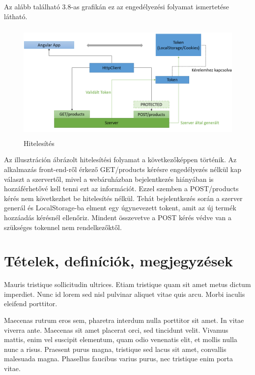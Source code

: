  Az alább található 3.8-as grafikán ez az engedélyezési folyamat ismertetése látható.
 
\begin{figure}[H]
	\centering
	\includegraphics[width=1.0\textwidth,height=220px]{images/hitelesites_bemutatasa.png}
	\caption{Hitelesítés}
	\label{fig.picture-9}
\end{figure}

Az illusztráción ábrázolt hitelesítési folyamat a következőképpen történik. Az alkalmazás front-end-ről érkező GET/products kérésre engedélyezés nélkül kap választ a szervertől, mivel a webáruházban bejelentkezés hiányában is hozzáférhetővé kell tenni ezt az információt. Ezzel szemben a POST/products kérés nem következhet be hitelesítés nélkül. Tehát bejelentkezés során a szerver generál és LocalStorage-ba elment egy úgynevezett tokent, amit az új termék hozzáadás kérésnél ellenőriz. Mindent összevetve a POST kérés védve van a szükséges tokennel nem rendelkezőktől.

\section{Tételek, definíciók, megjegyzések} %

\begin{definition}
Mauris tristique sollicitudin ultrices. Etiam tristique quam sit amet metus dictum imperdiet. Nunc id lorem sed nisl pulvinar aliquet vitae quis arcu. Morbi iaculis eleifend porttitor.
\end{definition}

Maecenas rutrum eros sem, pharetra interdum nulla porttitor sit amet. In vitae viverra ante. Maecenas sit amet placerat orci, sed tincidunt velit. Vivamus mattis, enim vel suscipit elementum, quam odio venenatis elit, et mollis nulla nunc a risus. Praesent purus magna, tristique sed lacus sit amet, convallis malesuada magna. Phasellus faucibus varius purus, nec tristique enim porta vitae.

